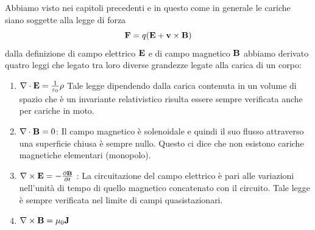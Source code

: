 Abbiamo visto nei capitoli precedenti e in questo come in generale le cariche siano soggette alla legge di forza 
\begin{equation*}
	\bold{F} = q ( \bold{E} + \bold{v} \times \bold{B})
\end{equation*}
dalla definizione di campo elettrico $\bold{E}$ e di campo magnetico $\bold{B}$ abbiamo derivato quatro 
leggi che legato tra loro diverse grandezze legate alla carica di un corpo:
\begin{enumerate}
	\item $\nabla \cdot \bold{E} = \frac{1}{\varepsilon_0} \rho$ \quad  {} \newline
	Tale legge dipendendo dalla carica contenuta in un volume di spazio che \`e un invariante relativistico risulta essere sempre verificata anche per cariche in moto.  
	\item $\nabla \cdot \bold{B} = 0 $:
	\newline
	Il campo magnetico \`e solenoidale e quindi il suo flusso attraverso una superficie chiusa \`e sempre nullo. Questo ci dice che non esistono cariche magnetiche elementari (monopolo).
	\item  $\nabla \times \bold{E} = - \frac{\partial \bold{B}}{\partial t}$ \quad {}:
	\newline
	La circuitazione del campo elettrico \`e pari alle variazioni nell'unit\`a di tempo di quello magnetico concatenato con il circuito. Tale legge \`e sempre verificata nel limite di campi quasistazionari. 
	\item  $\nabla \times \bold{B} = \mu_0 \bold{J}$ \quad  {}
\end{enumerate}

